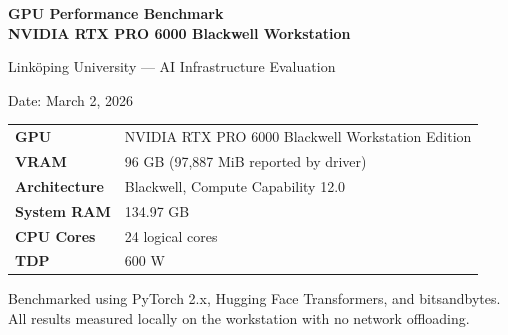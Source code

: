 \documentclass[11pt,a4paper]{article}
\begin{document}
\begin{titlepage}
  \centering
  \vspace*{2cm}
  {\Huge\bfseries\color{liu} GPU Performance Benchmark\\[0.4em]
   \large NVIDIA RTX PRO 6000 Blackwell Workstation\par}
  \vspace{1cm}
  {\large Linköping University --- AI Infrastructure Evaluation\par}
  \vspace{0.5cm}
  {\normalsize Date: March 2, 2026\par}
  \vspace{2cm}

  \begin{tabular}{ll}
    \toprule
    \textbf{GPU}          & NVIDIA RTX PRO 6000 Blackwell Workstation Edition \\
    \textbf{VRAM}         & 96 GB (97,887 MiB reported by driver) \\
    \textbf{Architecture} & Blackwell, Compute Capability 12.0 \\
    \textbf{System RAM}   & 134.97 GB \\
    \textbf{CPU Cores}    & 24 logical cores \\
    \textbf{TDP}          & 600 W \\
    \bottomrule
  \end{tabular}

  \vfill
  {\small Benchmarked using PyTorch 2.x, Hugging Face Transformers, and bitsandbytes.\\
  All results measured locally on the workstation with no network offloading.}
\end{titlepage}

\begin{abstract}
This report presents a comprehensive benchmark of the NVIDIA RTX PRO 6000 Blackwell
workstation GPU for Large Language Model (LLM) tasks. We evaluate three distinct
workloads: (1) raw hardware compute and memory bandwidth, (2) LLM inference throughput
across multiple model families and precisions, and (3) fine-tuning throughput under Full
Fine-Tuning, Low-Rank Adaptation (LoRA), and Quantized LoRA (QLoRA) regimes. System
resource utilisation (CPU, RAM, Swap) is monitored throughout. The results establish
effective capacity limits for both inference and training on a single-GPU workstation.
\end{abstract}
\end{document}
